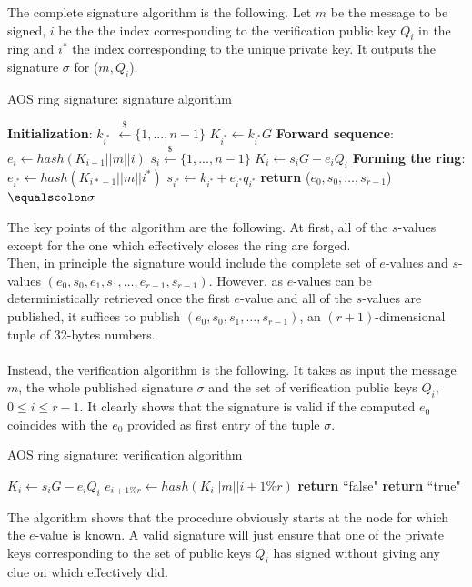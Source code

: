 The complete signature algorithm is the following. Let $m$ be the message to be signed, $i$ be the the index corresponding to the verification public key $Q_i$ in the ring and $i^{*}$ the index corresponding to the unique private key. It outputs the signature $\sigma$ for ($m, Q_i$).
\begin{algorithm}[H]
	\caption{AOS ring signature: signature algorithm}
	\label{alg:AOS_sign}
	\begin{algorithmic}[1]
		\State \textbf{Initialization}:
		\State $k_{i^{*}}$ $\xleftarrow{\text{\$}} \{1, ..., n - 1\}$    
		\State $K_{i^{*}} \gets k_{i^{*}}G$
		\State \textbf{Forward sequence}:
		\State $e_i \gets hash(K_{i-1}||m||i)$
		\State $s_i\xleftarrow{\text{\$}} \{1, ..., n - 1\}$   
		\State $K_i \gets s_iG - e_iQ_i$
		\EndFor
		\State \textbf{Forming the ring}:
		\State $e_{i^{*}} \gets hash(K_{{i{*}}-1}||m||i^{*})$
		\State $s_{i^{*}} \gets k_{i^{*}} + e_{i^{*}}q_{i^{*}}$
		\State \textbf{return} ($e_0, s_0, \dots, s_{r-1}$)$\equalscolon \sigma$
		\EndProcedure
	\end{algorithmic}
\end{algorithm}
\noindent
The key points of the algorithm are the following. At first, all of the $s$-values except for the one which effectively closes the ring are forged.\\
Then, in principle the signature would include the complete set of $e$-values and $s$-values $(e_0, s_0, e_1, s_1, \dots, e_{r-1}, s_{r-1})$. However, as $e$-values can be deterministically retrieved once the first $e$-value and all of the $s$-values are published, it suffices to publish $(e_0, s_0, s_1, \dots, s_{r-1})$, an $(r+1)$-dimensional tuple of 32-bytes numbers. \\ \ \\
Instead, the verification algorithm is the following. It takes as input the message $m$, the whole published signature $\sigma$ and the set of verification public keys $Q_i$, $0 \leq i \leq r-1$. It clearly shows that the signature is valid if the computed $e_0$ coincides with the $e_0$ provided as first entry of the tuple $\sigma$.
\begin{algorithm}[H]
	\caption{AOS ring signature: verification algorithm}
	\label{alg:AOS_verify}
	\begin{algorithmic}[1]
		\State $K_i \gets s_iG - e_iQ_i$
		\State $e_{i+1\%r} \gets hash(K_i||m||i+1\%r)$
		\EndFor
		 
		\State \textbf{return} ``false"
		\EndIf
		\State \textbf{return} ``true"
		\EndIf 
		\EndProcedure
	\end{algorithmic}
\end{algorithm}
\noindent
The algorithm shows that the procedure obviously starts at the node for which the $e$-value is known. A valid signature will just ensure that one of the private keys corresponding to the set of public keys $Q_i$ has signed without giving any clue on which effectively did.

